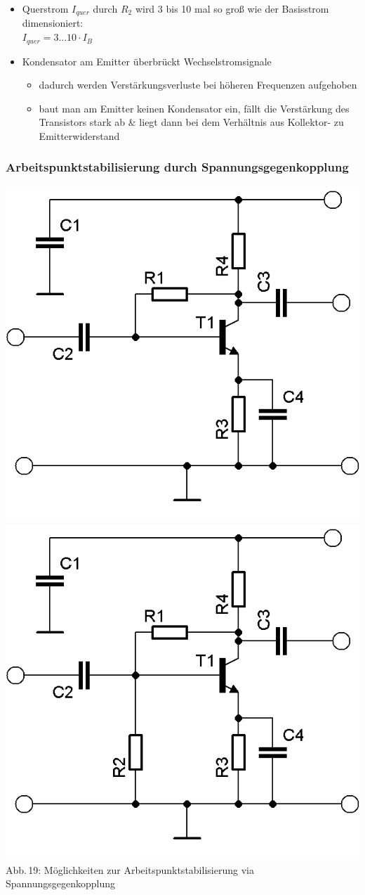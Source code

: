 \begin{frame}
  \begin{itemize}
    \item Querstrom $I_{quer}$ durch $R_2$ wird 3 bis 10 mal so groß wie der
      Basisstrom dimensioniert: \\

      $I_{quer} = 3 ... 10 \cdot I_B$

    \item Kondensator am Emitter überbrückt Wechselstromsignale
      \begin{itemize}
        \item dadurch werden Verstärkungsverluste bei höheren Frequenzen aufgehoben
        \item baut man am Emitter keinen Kondensator ein, fällt die Verstärkung des
          Transistors stark ab \& liegt dann bei dem Verhältnis aus Kollektor- zu
          Emitterwiderstand
      \end{itemize}
  \end{itemize}
\end{frame}

\begin{frame}
  \frametitle{Arbeitspunktstabilisierung durch Spannungsgegenkopplung}
  \begin{center}
    \includegraphics[width=.4\textwidth,height=.85\textheight,keepaspectratio]{a06/Transistor-Verstaerker-APstab2a.png}
    \vspace{3mm}
    \includegraphics[width=.4\textwidth,height=.85\textheight,keepaspectratio]{a06/Transistor-Verstaerker-APstab2b.png}\\
    {\tiny Abb.\,19: Möglichkeiten zur Arbeitspunktstabilisierung via Spannungsgegenkopplung}
  \end{center}
\end{frame}

